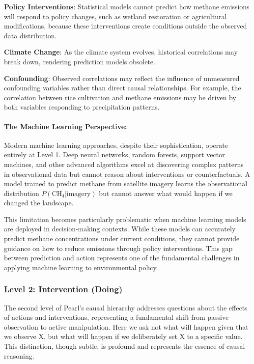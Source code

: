 \textbf{Policy Interventions}: Statistical models cannot predict how methane emissions will respond to policy changes, such as wetland restoration or agricultural modifications, because these interventions create conditions outside the observed data distribution.

\textbf{Climate Change}: As the climate system evolves, historical correlations may break down, rendering prediction models obsolete.

\textbf{Confounding}: Observed correlations may reflect the influence of unmeasured confounding variables rather than direct causal relationships. For example, the correlation between rice cultivation and methane emissions may be driven by both variables responding to precipitation patterns.

\paragraph{The Machine Learning Perspective:}

Modern machine learning approaches, despite their sophistication, operate entirely at Level 1. Deep neural networks, random forests, support vector machines, and other advanced algorithms excel at discovering complex patterns in observational data but cannot reason about interventions or counterfactuals. A model trained to predict methane from satellite imagery learns the observational distribution $P(\text{CH}_4|\text{imagery})$ but cannot answer what would happen if we changed the landscape.

This limitation becomes particularly problematic when machine learning models are deployed in decision-making contexts. While these models can accurately predict methane concentrations under current conditions, they cannot provide guidance on how to reduce emissions through policy interventions. This gap between prediction and action represents one of the fundamental challenges in applying machine learning to environmental policy.

\subsubsection{Level 2: Intervention (Doing)}

The second level of Pearl's causal hierarchy addresses questions about the effects of actions and interventions, representing a fundamental shift from passive observation to active manipulation. Here we ask not what will happen given that we observe X, but what will happen if we deliberately set X to a specific value. This distinction, though subtle, is profound and represents the essence of causal reasoning.

